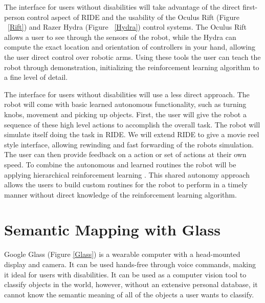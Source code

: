 \documentclass{sigchi}
\begin{document}
The interface for users without disabilities will take advantage of the direct first-person control aspect of RIDE and the usability of the Oculus Rift (Figure ~\ref{Rift}) and Razer Hydra (Figure ~\ref{Hydra}) control systems. The Oculus Rift allows a user to see through the sensors of the robot, while the Hydra can compute the exact location and orientation of controllers in your hand, allowing the user direct control over robotic arms. Using these tools the user can teach the robot through demonstration, initializing the reinforcement learning algorithm to a fine level of detail.

The interface for users without disabilities will use a less direct approach. The robot will come with basic learned autonomous functionality, such as turning knobs, movement and picking up objects. First, the user will give the robot a sequence of these high level actions to accomplish the overall task. The robot will simulate itself doing the task in RIDE. We will extend RIDE to give a movie reel style interface, allowing rewinding and fast forwarding of the robots simulation. The user can then provide feedback on a action or set of actions at their own speed. To combine the autonomous and learned routines the robot will be applying hierarchical reinforcement learning  \cite{Barto:2003:RAH:608557.608576}. This shared autonomy approach allows the users to build custom routines for the robot to perform in a timely manner without direct knowledge of the reinforcement learning algorithm.

\section{Semantic Mapping with Glass}
\label{Object Classification}
Google Glass (Figure \ref{Glass}) is a wearable computer with a head-mounted display and camera. It can be used hands-free through voice commands, making it ideal for users with disabilities. It can be used as a computer vision tool to classify objects in the world, however, without an extensive personal database, it cannot know the semantic meaning of all of the objects a user wants to classify. 
\end{document}
